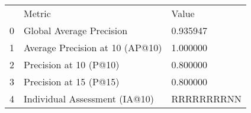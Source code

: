 \begin{tabular}{lll}
 & Metric & Value \\
0 & Global Average Precision & 0.935947 \\
1 & Average Precision at 10 (AP@10) & 1.000000 \\
2 & Precision at 10 (P@10) & 0.800000 \\
3 & Precision at 15 (P@15) & 0.800000 \\
4 & Individual Assessment (IA@10) & RRRRRRRRNN \\
\end{tabular}

